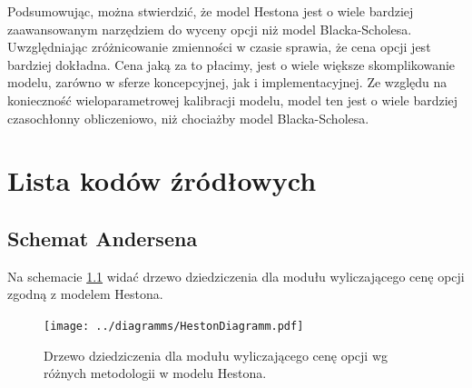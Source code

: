 \documentclass{pracamgr}
\begin{document}
Podsumowując, można stwierdzić, że model Hestona jest o wiele bardziej zaawansowanym
narzędziem do wyceny opcji niż model Blacka-Scholesa. Uwzględniając zróżnicowanie zmienności 
w czasie sprawia, że cena opcji jest bardziej dokładna. Cena jaką za to płacimy,
jest o wiele większe skomplikowanie modelu, zarówno w sferze koncepcyjnej, jak i 
implementacyjnej. Ze względu na konieczność wieloparametrowej kalibracji modelu, 
model ten jest o wiele bardziej czasochłonny obliczeniowo, niż chociażby model Blacka-Scholesa.

\cleardoublepage
{}
\appendix

\chapter{Lista kodów źródłowych}

\section{Schemat Andersena}

Na schemacie \ref{fig:currencyRisk} widać drzewo dziedziczenia dla modułu wyliczającego cenę
opcji zgodną z modelem Hestona.
\begin{figure}
  \centering  
  \texttt{[image: ../diagramms/HestonDiagramm.pdf]}
  \caption{Drzewo dziedziczenia dla modułu wyliczającego cenę opcji wg różnych metodologii w modelu Hestona.}\label{fig:currencyRisk}
\end{figure} 


\end{document}
